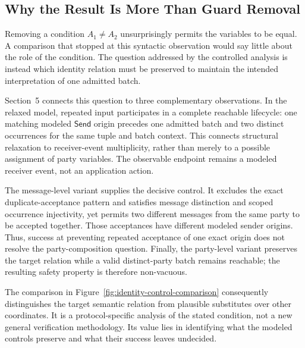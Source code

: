 
\subsection{Why the Result Is More Than Guard Removal}

Removing a condition \(A_1\neq A_2\) unsurprisingly permits the variables to
be equal. A comparison that stopped at this syntactic observation would say
little about the role of the condition. The question addressed by the
controlled analysis is instead which identity relation must be preserved to
maintain the intended interpretation of one admitted batch.

Section~5 connects this question to three complementary observations. In the
relaxed model, repeated input participates in a complete reachable lifecycle:
one matching modeled \(\mathsf{Send}\) origin precedes one admitted batch and
two distinct \receiveraccept occurrences for the same tuple and batch
context. This connects structural relaxation to receiver-event multiplicity,
rather than merely to a possible assignment of party variables. The
observable endpoint remains a modeled receiver event, not an application
action.

The message-level variant supplies the decisive control. It excludes the
exact duplicate-acceptance pattern and satisfies message distinction and
scoped occurrence injectivity, yet permits two different messages from the
same party to be accepted together. Those acceptances have different modeled
sender origins. Thus, success at preventing repeated acceptance of one exact
origin does not resolve the party-composition question. Finally, the
party-level variant preserves the target relation while a valid distinct-party
batch remains reachable; the resulting safety property is therefore
non-vacuous.

The comparison in Figure~\ref{fig:identity-control-comparison} consequently
distinguishes the target semantic relation from plausible substitutes over
other coordinates. It is a protocol-specific analysis of the stated
\batchreceive condition, not a new general verification methodology. Its
value lies in identifying what the modeled controls preserve and what their
success leaves undecided.

